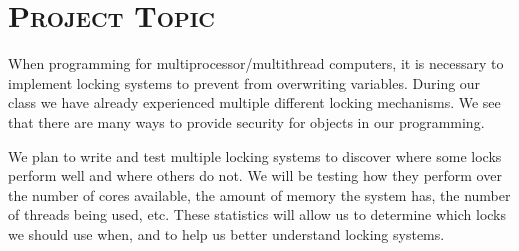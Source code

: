\documentclass[finalProject.tex]{subfiles}
\begin{document}
\bigskip

\section*{\textsc{\Large Project Topic}}

	When programming for multiprocessor/multithread computers, it is necessary to implement locking systems to prevent from overwriting variables.  During our class we have already experienced multiple different locking mechanisms.  We see that there are many ways to provide security for objects in our programming.  
	
	We plan to write and test multiple locking systems to discover where some locks perform well and where others do not.  We will be testing how they perform over the number of cores available, the amount of memory the system has, the number of threads being used, etc.  These statistics will allow us to determine which locks we should use when, and to help us better understand locking systems.
\end{document}
